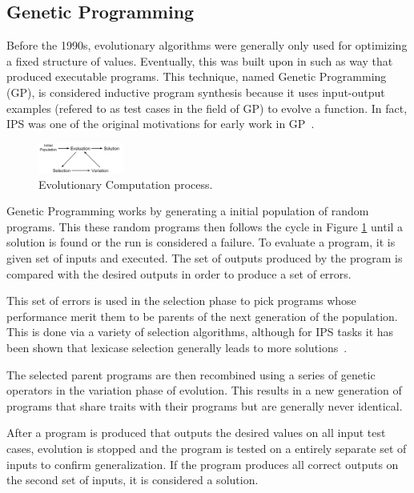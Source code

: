 \subsection{Genetic Programming}

Before the 1990s, evolutionary algorithms were generally only used for optimizing a fixed structure of values. Eventually, this was built upon in such as way that produced executable programs. This technique, named Genetic Programming (GP), is considered inductive program synthesis because it uses input-output examples (refered to as test cases in the field of GP) to evolve a function. In fact, IPS was one of the original motivations for early work in GP~\cite{Koza1992}.

\begin{figure}[t]
\centering
\includegraphics[width=0.25\textwidth]{res/EvolutionCycle}
\caption{Evolutionary Computation process.}
\label{fig:evo}
\end{figure}

Genetic Programming works by generating a initial population of random programs.  This these random programs then follows the cycle in Figure \ref{fig:evo} until a solution is found or the run is considered a failure. To evaluate a program, it is given set of inputs and executed. The set of outputs produced by the program is compared with the desired outputs in order to produce a set of errors. 

This set of errors is used in the selection phase to pick programs whose performance merit them to be parents of the next generation of the population. This is done via a variety of selection algorithms, although for IPS tasks it has been shown that lexicase selection generally leads to more solutions~\cite{Helmuth2015a, Helmuth2015c, Forstenlechner:2017:eurogp}.

The selected parent programs are then recombined using a series of genetic operators in the variation phase of evolution. This results in a new generation of programs that share traits with their programs but are generally never identical.

After a program is produced that outputs the desired values on all input test cases, evolution is stopped and the program is tested on a entirely separate set of inputs to confirm generalization. If the program produces all correct outputs on the second set of inputs, it is considered a solution.


